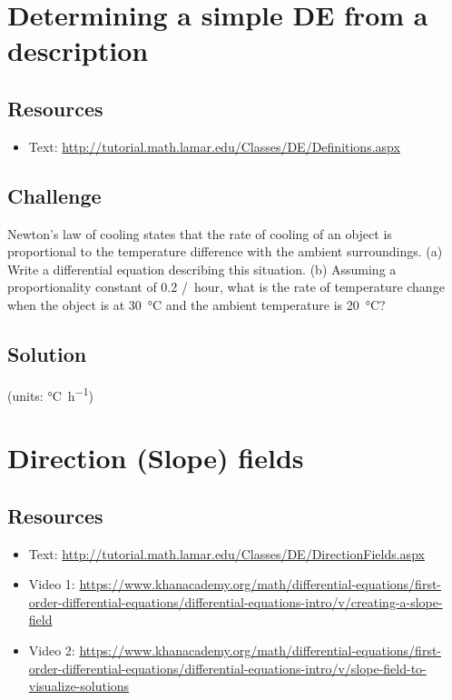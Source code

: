 \section{Determining a simple DE from a description}

\subsection*{Resources}
\begin{itemize}
    \item Text: \url{http://tutorial.math.lamar.edu/Classes/DE/Definitions.aspx}
\end{itemize}

\subsection*{Challenge}
Newton's law of cooling states that the rate of cooling of an object is proportional to the temperature difference with the ambient surroundings. (a) Write a differential equation describing this situation. (b) Assuming a proportionality constant of \num{0.2} \si{/hour}, what is the rate of temperature change when the object is at \SI{30}{\degreeCelsius} and the ambient temperature is \SI{20}{\degreeCelsius}?

\subsection*{Solution}
(units: \si{\degreeCelsius\per\hour})





\newpage
\section{Direction (Slope) fields}

\subsection*{Resources}
\begin{itemize}
    \item Text: \url{http://tutorial.math.lamar.edu/Classes/DE/DirectionFields.aspx}
    \item Video 1: \url{https://www.khanacademy.org/math/differential-equations/first-order-differential-equations/differential-equations-intro/v/creating-a-slope-field}
    \item Video 2: \url{https://www.khanacademy.org/math/differential-equations/first-order-differential-equations/differential-equations-intro/v/slope-field-to-visualize-solutions}
\end{itemize}

